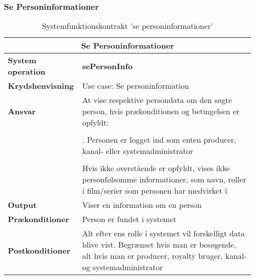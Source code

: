\subsubsection{Se Personinformationer}
\begin{table}[H]
    \centering
    \begin{tabular}{| p{4cm} | p{12cm} |}
    \hline
    \multicolumn{2}{|c|}{\textbf{Se Personinformationer}}\\
    \hline
    \textbf{System operation}       & \textbf{sePersonInfo} \\ \hline
    \textbf{Krydshenvisning}        & Use case: Se personinformation \\ \hline
    \textbf{Ansvar}                 & At vise respektive persondata om den søgte person, hvis prækonditionen og betingelsen er opfyldt:\\
                                    & \\
                                    & \quad 1. Personen er logget ind som enten producer, kanal- eller systemadministrator\\
                                    & \\
                                    & Hvis ikke overstående er opfyldt, vises ikke personfølsomme informationer, som navn, roller i film/serier som personen har medvirket i\\ \hline
    \textbf{Output}                 & Viser en information om en person \\ \hline
    \textbf{Prækonditioner}         & Person er fundet i systemet \\ \hline
    \textbf{Postkonditioner}        & Alt efter ens rolle i systemet vil forskelligt data blive vist. Begrænset hvis man er besøgende, alt hvis man er producer, royalty bruger, kanal- og systemadministrator \\ \hline
    \end{tabular}
    \caption{Systemfunktionskontrakt 'se personinformationer'}
    \label{tab:kontrakter_se_personinformationer}
\end{table}

